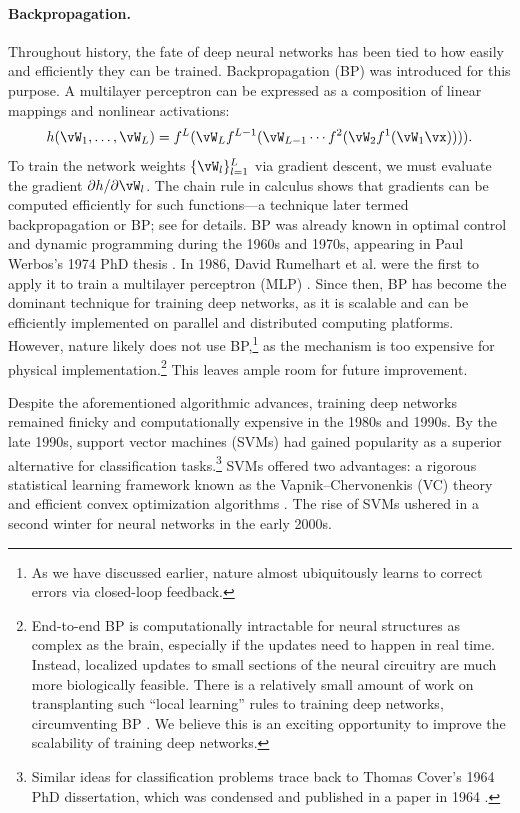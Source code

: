 \documentclass[../../book-main.tex]{subfiles}
\begin{document}
\paragraph{Backpropagation.}
Throughout history, the fate of deep neural networks has been tied to
how easily and efficiently they can be trained. Backpropagation (BP)
was introduced for this purpose. A multilayer perceptron can be
expressed as a composition of linear mappings and nonlinear activations:
\begin{equation}
    h(\vW_{1}, \ldots, \vW_{L}) = f^{L}(\vW_{L}f^{L-1}(\vW_{L-1}
    \cdots f^{2}(\vW_{2}f^{1}(\vW_{1}\vx)))).
\end{equation}
To train the network weights \(\{\vW_{l}\}_{l=1}^{L}\) via gradient
descent, we must evaluate the gradient \(\partial h/\partial
\vW_{l}\). The chain rule in calculus shows that gradients can be
computed efficiently for such functions---a technique later termed
backpropagation or BP; see  for details. BP
was already known in optimal control and dynamic programming during
the 1960s and 1970s, appearing in Paul Werbos's 1974 PhD thesis
\cite{Werbos-1974, Werbos1994TheRO}. In 1986, David Rumelhart et al.
were the first to apply it to train a multilayer perceptron (MLP)
\cite{Rumelhart1986}. Since then, BP has become the dominant
technique for training deep networks, as it is scalable and can be
efficiently implemented on parallel and distributed computing
platforms. However, nature likely does not use BP,\footnote{As we
    have discussed earlier, nature almost ubiquitously learns to correct
errors via closed-loop feedback.} as the mechanism is too expensive
for physical implementation.\footnote{End-to-end BP is
    computationally intractable for neural structures as complex as the
    brain, especially if the updates need to happen in real time.
    Instead, localized updates to small sections of the neural circuitry
    are much more biologically feasible. There is a relatively small
    amount of work on transplanting such ``local learning'' rules to
    training deep networks, circumventing BP
    \cite{baldi2016theory,millidge2022predictive,li2025noprop}. We
    believe this is an exciting opportunity to improve the scalability of
training deep networks.} This leaves ample room for future improvement.

Despite the aforementioned algorithmic advances, training deep
networks remained finicky and computationally expensive in the 1980s
and 1990s. By the late 1990s, support vector machines (SVMs)
\cite{SVM-1995} had gained popularity as a superior alternative for
classification tasks.\footnote{Similar ideas for classification
    problems trace back to Thomas Cover's 1964 PhD dissertation, which
was condensed and published in a paper in 1964 \cite{Cover-1964}.}
SVMs offered two advantages: a rigorous statistical learning
framework known as the Vapnik--Chervonenkis (VC) theory and efficient
convex optimization algorithms \cite{BoydVa04}. The rise of SVMs
ushered in a second winter for neural networks in the early 2000s.
\end{document}

